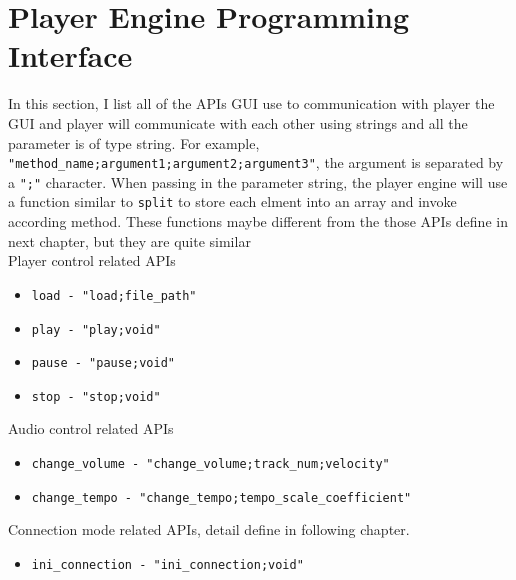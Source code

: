 \section{Player Engine Programming Interface}
In this section, I list all of the APIs GUI use to communication with player 
the GUI and player will communicate with each other using strings and 
all the parameter is of type string. For example, 
\texttt{"method\_name;argument1;argument2;argument3"}, the argument is 
separated by a \texttt{";"}
character. When passing in the parameter string, the player engine will 
use a function similar to \texttt{split} to store each elment into an
array and invoke according method. These functions maybe different
from the those APIs define in next chapter, but they are quite similar\\
Player control related APIs 
\begin{itemize}
  \item \texttt{load - "load;file\_path"}
  \item \texttt{play - "play;void"}  
  \item \texttt{pause - "pause;void"}
  \item \texttt{stop - "stop;void"}
\end{itemize}
Audio control related APIs
\begin{itemize}
  \item \texttt{change\_volume - "change\_volume;track\_num;velocity"}  
  \item \texttt{change\_tempo - "change\_tempo;tempo\_scale\_coefficient"}  
\end{itemize}
Connection mode related APIs, detail define in following chapter.
\begin{itemize}
  \item \texttt{ini\_connection - "ini\_connection;void"}  
\end{itemize}
